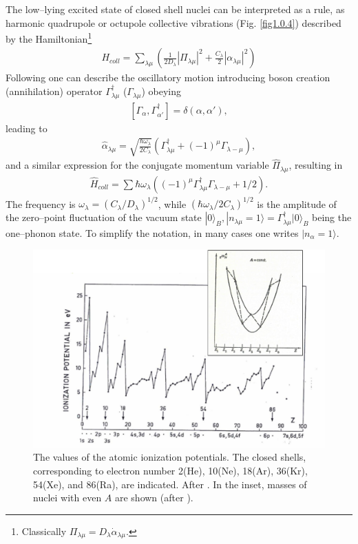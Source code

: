 \documentclass[a4paper,11pt]{book}
\numberwithin{equation}{section}
\numberwithin{figure}{section}
\numberwithin{table}{section}
\newcommand{\ket}[1]{|{#1} \rangle }
\begin{document}
The low--lying excited state of closed shell nuclei can be interpreted as a rule, as harmonic quadrupole or octupole collective vibrations (Fig. \ref{fig1.0.4}) described by the Hamiltonian\footnote{Classically $\Pi_{\lambda\mu}=D_\lambda\dot\alpha_{\lambda\mu}$.}
\begin{align}\label{eq1.0.7}
H_{coll}=\sum_{\lambda\mu}\left(\frac{1}{2D_{\lambda}}|\Pi_{\lambda\mu}|^2+\frac{C_\lambda}{2}|\alpha_{\lambda\mu}|^2\right)
\end{align}
Following \cite{Dirac:26} one can describe the oscillatory motion introducing boson creation (annihilation) operator $\Gamma_{\lambda\mu}^\dagger$ ($\Gamma_{\lambda\mu}$) obeying
\begin{align}\label{eq1.0.8}
\left[\Gamma_{\alpha},\Gamma_{\alpha'}^\dagger\right]=\delta(\alpha,\alpha'),
\end{align}
leading to 
\begin{align}\label{eq1.0.9}
\hat\alpha_{\lambda\mu}=\sqrt{\frac{\hbar\omega_\lambda}{2C_\lambda}}\left(\Gamma_{\lambda\mu}^\dagger+(-1)^\mu\Gamma_{\lambda-\mu}\right),
\end{align}
and a similar expression for the conjugate momentum variable $\hat\Pi_{\lambda\mu}$, resulting in 
\begin{align}\label{eq1.0.9b}
\hat H_{coll}=\sum\hbar\omega_\lambda\left((-1)^\mu\Gamma_{\lambda\mu}^\dagger\Gamma_{\lambda-\mu}+1/2\right).
\end{align}
The frequency is $\omega_\lambda=(C_\lambda/D_\lambda)^{1/2}$, while $(\hbar\omega_\lambda/2C_\lambda)^{1/2}$ is the amplitude of the zero--point fluctuation of the vacuum state $\ket{0}_B,\ket{n_{\lambda\mu}=1}=\Gamma_{\lambda\mu}^\dagger \ket{0}_B$ being the one--phonon state. To simplify the notation, in many cases one writes $\ket{n_\alpha=1}$.
\begin{figure}
	\centerline {
		\includegraphics*[width=20cm, angle=0.6]{introduccion/figs/figpreface1}
	}
	\caption{The values of the atomic ionization potentials. The  closed shells, corresponding to electron number 2(He), 10(Ne), 18(Ar), 36(Kr), 54(Xe), and 86(Ra), are indicated. After \cite{Bohr:69}. In the inset, masses of nuclei with even $A$ are shown (after \cite{Mayer:55}).}
	\label{fig1.0.1}
\end{figure}
\end{document}
